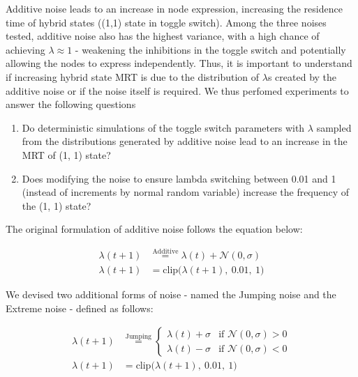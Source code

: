 \documentclass[11pt]{article}
\begin{document}
Additive noise leads to an increase in node expression, increasing the residence time of hybrid states ((1,1) state in toggle switch). Among the three noises tested, additive noise also has the highest variance, with a high chance of achieving $\lambda \approx 1$ - weakening the inhibitions in the toggle switch and potentially allowing the nodes to express independently. Thus, it is important to understand if increasing hybrid state MRT is due to the distribution of $\lambda$s created by the additive noise or if the noise itself is required. We thus perfomed experiments to answer the following questions

\begin{enumerate}

    \item Do deterministic simulations of the toggle switch parameters with $\lambda$ sampled from the distributions generated by additive noise lead to an increase in the MRT of (1, 1) state?
    \item Does modifying the noise to ensure lambda switching between 0.01 and 1 (instead of increments by normal random variable) increase the frequency of the (1, 1) state?
\end{enumerate}
The original formulation of additive noise follows the equation below:

\begin{equation}
\begin{split}
    \lambda(t+1) &\overset{\text{Additive}}{=} 
        \lambda(t) + \mathcal{N}(0,\sigma)\\
    \lambda(t+1) &= \text{clip}\bigl(\lambda(t+1),\ 0.01,\ 1\bigr)
\end{split}
\label{additiveNoise}
\end{equation}

We devised two additional forms of noise - named the Jumping noise and the Extreme noise - defined as follows:


\begin{equation}
\begin{split}
    \lambda(t+1) &\overset{\text{Jumping}}{=} 
    \begin{cases}
        \lambda(t) + \sigma & \text{if } \mathcal{N}(0,\sigma) > 0 \\
        \lambda(t) - \sigma & \text{if } \mathcal{N}(0,\sigma) < 0
    \end{cases} \\[6pt]
    \lambda(t+1) &= \text{clip}\bigl(\lambda(t+1),\ 0.01,\ 1\bigr)
\end{split}
\label{jumpingNoise}
\end{equation}
\end{document}
